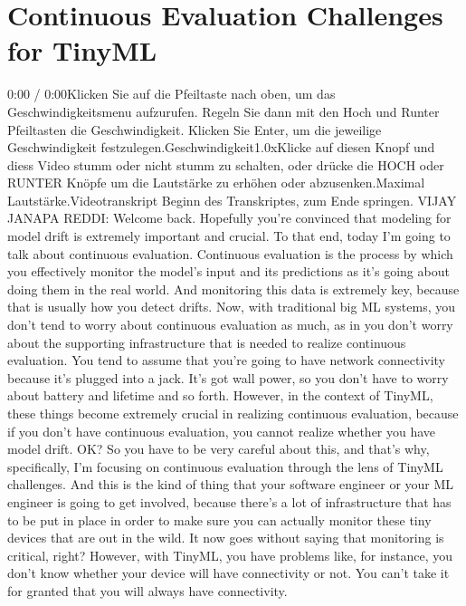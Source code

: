 {{{{{{{{\section{Continuous Evaluation Challenges for TinyML}

    0:00 / 0:00Klicken Sie auf die Pfeiltaste nach oben, um das Geschwindigkeitsmenu aufzurufen. Regeln Sie dann mit den Hoch und Runter Pfeiltasten die Geschwindigkeit. Klicken Sie Enter, um die jeweilige Geschwindigkeit festzulegen.Geschwindigkeit1.0xKlicke auf diesen Knopf und diess Video stumm oder nicht stumm zu schalten, oder drücke die HOCH oder RUNTER Knöpfe um die Lautstärke zu erhöhen oder abzusenken.Maximal Lautstärke.Videotranskript
    Beginn des Transkriptes, zum Ende springen.
    VIJAY JANAPA REDDI: Welcome back.
    Hopefully you're convinced that modeling for model drift
    is extremely important and crucial.
    To that end, today I'm going to talk about continuous evaluation.
    Continuous evaluation is the process by which you effectively
    monitor the model's input and its predictions
    as it's going about doing them in the real world.
    And monitoring this data is extremely key,
    because that is usually how you detect drifts.
    Now, with traditional big ML systems, you
    don't tend to worry about continuous evaluation as much,
    as in you don't worry about the supporting infrastructure that
    is needed to realize continuous evaluation.
    You tend to assume that you're going to have network connectivity because it's
    plugged into a jack.
    It's got wall power, so you don't have to worry about battery and lifetime
    and so forth.
    However, in the context of TinyML, these things become extremely crucial
    in realizing continuous evaluation, because if you don't have continuous
    evaluation, you cannot realize whether you have model drift.
    OK?
    So you have to be very careful about this,
    and that's why, specifically, I'm focusing on continuous evaluation
    through the lens of TinyML challenges.
    And this is the kind of thing that your software engineer or your ML engineer
    is going to get involved, because there's a lot of infrastructure that
    has to be put in place in order to make sure you can actually
    monitor these tiny devices that are out in the wild.
    It now goes without saying that monitoring is critical, right?
    However, with TinyML, you have problems like, for instance, you
    don't know whether your device will have connectivity or not.
    You can't take it for granted that you will always have connectivity.
}}}}}}}}

